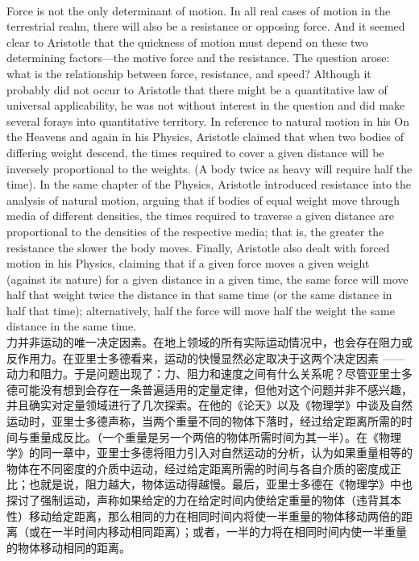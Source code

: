 \documentclass{article}
\begin{document}
\\
Force is not the only determinant of motion. In all real cases of motion in the terrestrial realm, there will also be a resistance or opposing force. And it seemed clear to Aristotle that the quickness of motion must depend on these two determining factors—the motive force and the resistance. The question arose: what is the relationship between force, resistance, and speed? Although it probably did not occur to Aristotle that there might be a quantitative law of universal applicability, he was not without interest in the question and did make several forays into quantitative territory. In reference to natural motion in his On the Heavens and again in his Physics, Aristotle claimed that when two bodies of differing weight descend, the times required to cover a given distance will be inversely proportional to the weights. (A body twice as heavy will require half the time). In the same chapter of the Physics, Aristotle introduced resistance into the analysis of natural motion, arguing that if bodies of equal weight move through media of different densities, the times required to traverse a given distance are proportional to the densities of the respective media; that is, the greater the resistance the slower the body moves. Finally, Aristotle also dealt with forced motion in his Physics, claiming that if a given force moves a given weight (against its nature) for a given distance in a given time, the same force will move half that weight twice the distance in that same time (or the same distance in half that time); alternatively, half the force will move half the weight the same distance in the same time.\\
力并非运动的唯一决定因素。在地上领域的所有实际运动情况中，也会存在阻力或反作用力。在亚里士多德看来，运动的快慢显然必定取决于这两个决定因素 —— 动力和阻力。于是问题出现了：力、阻力和速度之间有什么关系呢？尽管亚里士多德可能没有想到会存在一条普遍适用的定量定律，但他对这个问题并非不感兴趣，并且确实对定量领域进行了几次探索。在他的《论天》以及《物理学》中谈及自然运动时，亚里士多德声称，当两个重量不同的物体下落时，经过给定距离所需的时间与重量成反比。（一个重量是另一个两倍的物体所需时间为其一半）。在《物理学》的同一章中，亚里士多德将阻力引入对自然运动的分析，认为如果重量相等的物体在不同密度的介质中运动，经过给定距离所需的时间与各自介质的密度成正比；也就是说，阻力越大，物体运动得越慢。最后，亚里士多德在《物理学》中也探讨了强制运动，声称如果给定的力在给定时间内使给定重量的物体（违背其本性）移动给定距离，那么相同的力在相同时间内将使一半重量的物体移动两倍的距离（或在一半时间内移动相同距离）；或者，一半的力将在相同时间内使一半重量的物体移动相同的距离。\\
\end{document}
